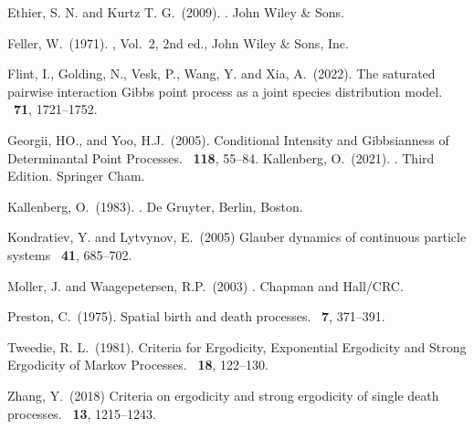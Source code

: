 \documentclass[12pt]{article}
\newcounter{con}%
\numberwithin{equation}{section}
\begin{document}
\begin{thebibliography}{}
Ethier, S. N. and Kurtz T. G.~(2009).
.
\newblock John Wiley \& Sons.

Feller, W.~(1971). 
, Vol.~2, 2nd ed., 
\newblock John Wiley \& Sons, Inc.

Flint, I., Golding, N., Vesk, P., Wang, Y. and Xia, A.~(2022). 
\newblock The saturated pairwise interaction Gibbs point process as a joint species distribution model. 
~\textbf{71}, 1721--1752.

Georgii, HO., and Yoo, H.J.~(2005).
\newblock Conditional Intensity and Gibbsianness of Determinantal Point Processes.
~\textbf{118}, 55--84.
Kallenberg, O.~(2021).
.
\newblock Third Edition. Springer Cham.

Kallenberg, O.~(1983).
.
\newblock De Gruyter, Berlin, Boston.

Kondratiev, Y. and Lytvynov, E.~(2005)
\newblock Glauber dynamics of continuous particle systems
~\textbf{41}, 685--702. 

Moller, J. and Waagepetersen, R.P.~(2003)
.
\newblock Chapman and Hall/CRC.

Preston, C.~(1975).
\newblock Spatial birth and death processes.
\newblock {\em \aap}~\textbf{7}, 371--391.

Tweedie, R. L.~(1981).
\newblock Criteria for Ergodicity, Exponential Ergodicity and Strong Ergodicity of Markov Processes.
\newblock {\em \jap}~\textbf{18}, 122--130.

Zhang, Y.~(2018)
\newblock Criteria on ergodicity and strong ergodicity of single death processes.
~\textbf{13}, 1215--1243.

  \end{thebibliography}
\end{document}
